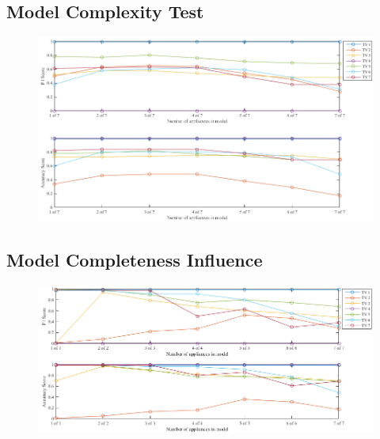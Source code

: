 \newpage

\subsection{Model Complexity Test}

\begin{figure}[H]
\centering
\includegraphics[width=1\textwidth]{billeder/ModelCompletness.png}
\caption{}
\end{figure}

\subsection{ Model Completeness Influence }

\begin{figure}[H]
\centering
\includegraphics[width=1\textwidth]{billeder/ModelSize.png}
\caption{}
\end{figure}